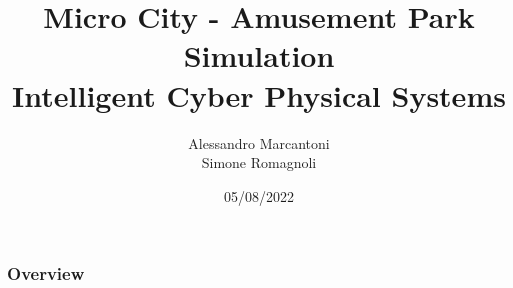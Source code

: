 \documentclass[
    11pt, %
]{beamer}
\title[microcity]{Micro City - Amusement Park Simulation \\ Intelligent Cyber Physical Systems}
\author[Marcantoni, Romagnoli]{Alessandro Marcantoni\\Simone Romagnoli}
\date[05/08/2022]{05/08/2022}
\begin{document}
    \begin{frame}
        \titlepage
    \end{frame}

    \begin{frame}
        \frametitle{Overview}
        \tableofcontents
    \end{frame}

    
    
\end{document}
